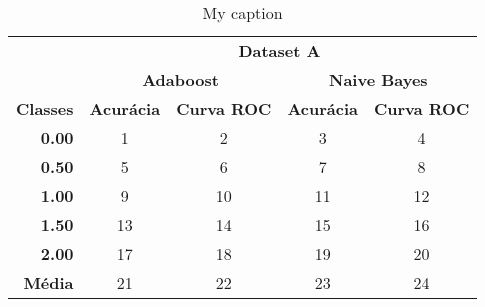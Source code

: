 \begin{table}[H]
\centering
\begin{tabular}{r|c|c|c|c|}
\cline{2-5}
\multicolumn{1}{c|}{}                  & \multicolumn{4}{c|}{\textbf{Dataset A}}                                            \\ \cline{2-5} 
\multicolumn{1}{l|}{}                  & \multicolumn{2}{c|}{\textbf{Adaboost}} & \multicolumn{2}{c|}{\textbf{Naive Bayes}} \\ \hline
\multicolumn{1}{|c|}{\textbf{Classes}} & \textbf{Acurácia} & \textbf{Curva ROC} & \textbf{Acurácia}   & \textbf{Curva ROC}  \\ \hline
\multicolumn{1}{|r|}{\textbf{0.00}}    & 1                 & 2                  & 3                   & 4                   \\ \hline
\multicolumn{1}{|r|}{\textbf{0.50}}    & 5                 & 6                  & 7                   & 8                   \\ \hline
\multicolumn{1}{|r|}{\textbf{1.00}}    & 9                 & 10                 & 11                  & 12                  \\ \hline
\multicolumn{1}{|r|}{\textbf{1.50}}    & 13                & 14                 & 15                  & 16                  \\ \hline
\multicolumn{1}{|r|}{\textbf{2.00}}    & 17                & 18                 & 19                  & 20                  \\ \hline
\multicolumn{1}{|r|}{\textbf{Média}}   & 21                & 22                 & 23                  & 24                  \\ \hline
\end{tabular}
\caption{My caption}
\label{table:evaluation_result_b}
\end{table}


